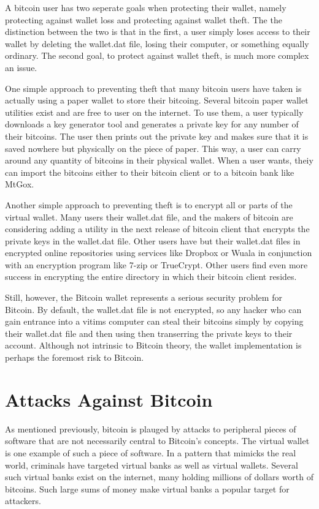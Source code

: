 \documentclass{report}
\begin{document}
A bitcoin user has two seperate goals when protecting their wallet, namely protecting
against wallet loss and protecting against wallet theft.  The the distinction between 
the two is that in the first, a user simply loses access to their wallet by deleting 
the wallet.dat file, losing their computer, or something equally ordinary.  The second 
goal, to protect against wallet theft, is much more complex an issue.

One simple approach to preventing theft that many bitcoin users have taken is actually 
using a paper wallet to store their bitcoing.  Several bitcoin paper wallet utilities 
exist and are free to user on the internet.  To use them, a user typically downloads a 
key generator tool and generates a private key for any number of their bitcoins.  The 
user then prints out the private key and makes sure that it is saved nowhere but 
physically on the piece of paper.  This way, a user can carry around any quantity of 
bitcoins in their physical wallet.  When a user wants, theiy can import the bitcoins 
either to their bitcoin client or to a bitcoin bank like MtGox.

Another simple approach to preventing theft is to encrypt all or parts of the virtual 
wallet.  Many users their wallet.dat file, and the makers of bitcoin are considering 
adding a utility in the next release of bitcoin client that encrypts the private keys 
in the wallet.dat file.  Other users have but their wallet.dat files in encrypted online 
repositories using services like Dropbox or Wuala in conjunction with an encryption 
program like 7-zip or TrueCrypt.  Other users find even more success in encrypting the 
entire directory in which their bitcoin client resides.

Still, however, the Bitcoin wallet represents a serious security problem for Bitcoin.  
By default, the wallet.dat file is not encrypted, so any hacker who can gain entrance 
into a vitims computer can steal their bitcoins simply by copying their wallet.dat file 
and then using then transerring the private keys to their account.  Although not intrinsic 
to Bitcoin theory, the wallet implementation is perhaps the foremost risk to Bitcoin.

\section*{Attacks Against Bitcoin}
As mentioned previously, bitcoin is plauged by attacks to peripheral pieces of software 
that are not necessarily central to Bitcoin's concepts.  The virtual wallet is one example
of such a piece of software.  In a pattern that mimicks the real world, criminals have
targeted virtual banks as well as virtual wallets.  Several such virtual banks exist on
the internet, many holding millions of dollars worth of bitcoins.  Such large sums of 
money make virtual banks a popular target for attackers.
\end{document}
